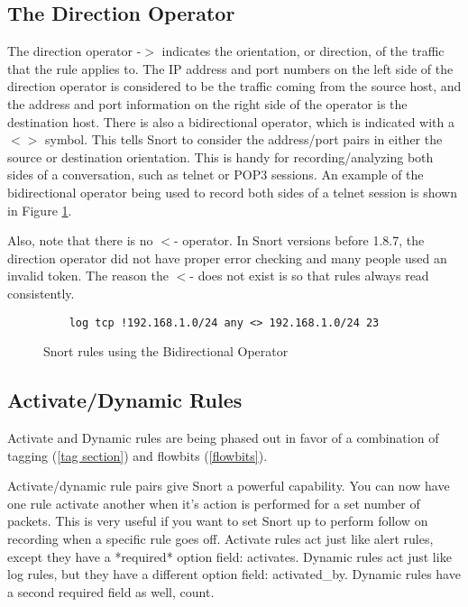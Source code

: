 \documentclass[english]{report}
\newenvironment{note}{
\samepage
    \vspace{10pt}{\textsf{
        {\hspace{7pt}\Huge{$\triangle$\hspace{-12.5pt}{\Large{$^!$}}}}\hspace{5pt}
        {\Large{NOTE}}
    }
    }
   \begin{center}
    \par\vspace{-17pt}

    \begin{lrbox}{\savepar}
    \begin{minipage}[r]{6in}
}
{
    \end{minipage}
    \end{lrbox}
    \fbox{
        \usebox{
            \savepar
	}
    }
    \par\vskip10pt
    \end{center}
}
\newenvironment{note}{
        \begin{rawhtml}
        <p><table border="1"><tr><td><b>
        Note:&nbsp;&nbsp;</b>
        \end{rawhtml}
}{
        \begin{rawhtml}
        </b></td></tr></table></p>
        \end{rawhtml}
}
\begin{document}
\subsection{The Direction Operator}

The direction operator -$>$ indicates the orientation, or direction, of the
traffic that the rule applies to. The IP address and port numbers on the left
side of the direction operator is considered to be the traffic coming from the
source host, and the address and port information on the right side of the
operator is the destination host. There is also a bidirectional operator, which
is indicated with a $<>$ symbol. This tells Snort to consider the address/port
pairs in either the source or destination orientation. This is handy for
recording/analyzing both sides of a conversation, such as telnet or POP3
sessions. An example of the bidirectional operator being used to record both
sides of a telnet session is shown in Figure \ref{bidirectional operator}.

Also, note that there is no $<$- operator. In Snort versions before 1.8.7, the
direction operator did not have proper error checking and many people used an
invalid token. The reason the $<$- does not exist is so that rules always read
consistently.

\begin{figure}
\begin{verbatim}
    log tcp !192.168.1.0/24 any <> 192.168.1.0/24 23
\end{verbatim}

\caption{\label{bidirectional operator}Snort rules using the Bidirectional
Operator}
\end{figure}

\subsection{Activate/Dynamic Rules}
\label{dynamic rules}

\begin{note}

Activate and Dynamic rules are being phased out in favor of a combination of
tagging (\ref{tag section}) and flowbits (\ref{flowbits}). 

\end{note}

Activate/dynamic rule pairs give Snort a powerful capability. You can now have
one rule activate another when it's action is performed for a set number of
packets. This is very useful if you want to set Snort up to perform follow on
recording when a specific rule goes off. Activate rules act just like alert
rules, except they have a {*}required{*} option field: activates.  Dynamic
rules act just like log rules, but they have a different option field:
activated\_by. Dynamic rules have a second required field as well, count. 
\end{document}
